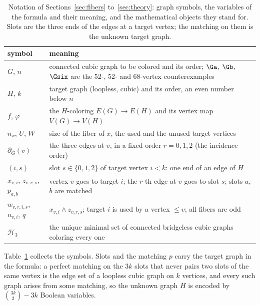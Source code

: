 \begin{table}[t]\centering\small
\begin{tabular}{lp{}}
\toprule
symbol & meaning \\
\midrule
$G$, $n$ & connected cubic graph to be colored and its order; $\Ga$, $\Gb$, $\Gsix$ are the 52-, 52- and 68-vertex counterexamples \\
$H$, $k$ & target graph (loopless, cubic) and its order, an even number below $n$ \\
$f$, $\varphi$ & the $H$-coloring $E(G) \to E(H)$ and its vertex map $V(G) \to V(H)$ \\
$n_x$, $U$, $W$ & size of the fiber of $x$, the used and the unused target vertices \\
$\partial_G(v)$ & the three edges at $v$, in a fixed order $r = 0, 1, 2$ (the incidence order) \\
$(i,s)$ & slot $s \in \{0,1,2\}$ of target vertex $i < k$: one end of an edge of $H$ \\
$x_{v,i}$, $z_{v,r,s}$, $p_{a,b}$ & vertex $v$ goes to target $i$; the $r$-th edge at $v$ goes to slot $s$; slots $a$, $b$ are matched \\
$w_{v,r,i,s}$, $u_{v,i}$, $q$ & $x_{v,i} \wedge z_{v,r,s}$; target $i$ is used by a vertex $\le v$; all fibers are odd \\
$\mathcal{H}_3$ & the unique minimal set of connected bridgeless cubic graphs coloring every one \\
\bottomrule
\end{tabular}
\caption{Notation of Sections~\ref{sec:fibers} to~\ref{sec:theory}: graph symbols, the variables of the formula and their meaning, and the
mathematical objects they stand for. Slots are the three ends of the edges at a target vertex; the matching on them is the unknown target graph.}\label{tab:notation}
\end{table}

Table~\ref{tab:notation} collects the symbols. Slots and the matching $p$ carry the target graph in the formula: a perfect matching on the $3k$ slots that
never pairs two slots of the same vertex is the edge set of a loopless cubic graph on $k$ vertices, and every such graph arises from some matching,
so the unknown graph $H$ is encoded by $\binom{3k}{2} - 3k$ Boolean variables.
